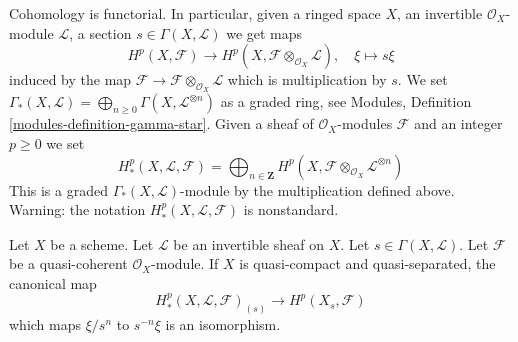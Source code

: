 \noindent
Cohomology is functorial. In particular, given a ringed space $X$,
an invertible $\mathcal{O}_X$-module $\mathcal{L}$, a section
$s \in \Gamma(X, \mathcal{L})$ we get maps
$$
H^p(X, \mathcal{F})
\longrightarrow
H^p(X, \mathcal{F} \otimes_{\mathcal{O}_X} \mathcal{L}), \quad
\xi \longmapsto s\xi
$$
induced by the map
$\mathcal{F} \to \mathcal{F} \otimes_{\mathcal{O}_X} \mathcal{L}$
which is multiplication by $s$. We set
$\Gamma_*(X, \mathcal{L}) =
\bigoplus_{n \geq 0} \Gamma(X, \mathcal{L}^{\otimes n})$
as a graded ring, see
Modules, Definition \ref{modules-definition-gamma-star}.
Given a sheaf of $\mathcal{O}_X$-modules $\mathcal{F}$ and an integer
$p \geq 0$ we set
$$
H^p_*(X, \mathcal{L}, \mathcal{F}) =
\bigoplus\nolimits_{n \in \mathbf{Z}} H^p(X,
\mathcal{F} \otimes_{\mathcal{O}_X} \mathcal{L}^{\otimes n})
$$
This is a graded $\Gamma_*(X, \mathcal{L})$-module by the multiplication
defined above. Warning: the notation $H^p_*(X, \mathcal{L}, \mathcal{F})$
is nonstandard.

\begin{lemma}
\label{lemma-invert-s-cohomology}
Let $X$ be a scheme. Let $\mathcal{L}$ be an invertible sheaf on $X$.
Let $s \in \Gamma(X, \mathcal{L})$.
Let $\mathcal{F}$ be a quasi-coherent $\mathcal{O}_X$-module.
If $X$ is quasi-compact and quasi-separated, the canonical map
$$
H^p_*(X, \mathcal{L}, \mathcal{F})_{(s)}
\longrightarrow
H^p(X_s, \mathcal{F})
$$
which maps $\xi/s^n$ to $s^{-n}\xi$ is an isomorphism.
\end{lemma}

